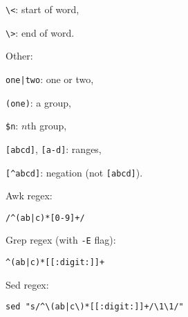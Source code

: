 \begin{compactenum}
\begin{compactenum}
\item \texttt{\textbackslash{}<}: start of word, 
\item \texttt{\textbackslash{}>}: end of word.
\end{compactenum}
\item Other:
\begin{compactenum}
\item \texttt{one|two}: one or two,
\item \texttt{(one)}: a group,
\item \texttt{\$n}: $n$th group,
\item \texttt{[abcd]}, \texttt{[a-d]}: ranges,
\item \texttt{[\textasciicircum{}abcd]}: negation (not \texttt{[abcd]}).
\end{compactenum}
\end{compactenum}

Awk regex:
\begin{verbatim}
/^(ab|c)*[0-9]+/
\end{verbatim}

Grep regex (with \texttt{-E} flag):
\begin{verbatim}
^(ab|c)*[[:digit:]]+
\end{verbatim}

Sed regex:
\begin{verbatim}
sed "s/^\(ab|c\)*[[:digit:]]+/\1\1/"
\end{verbatim}


